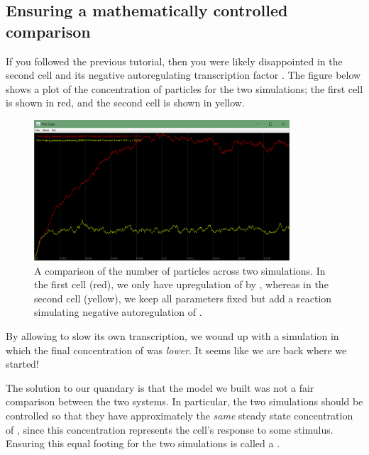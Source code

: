 \FloatBarrier
{}
\subsection{Ensuring a mathematically controlled comparison}

If you followed the previous tutorial, then you were likely disappointed in the second cell and its negative autoregulating transcription factor . The figure below shows a plot of the concentration of  particles for the two simulations; the first cell is shown in red, and the second cell is shown in yellow.

\begin{figure}[h]
\centering
\mySfFamily
\includegraphics[width = 0.85\textwidth]{../images/nar_unequal_chart.png}
\caption{A comparison of the number of  particles across two simulations. In the first cell (red), we only have upregulation of  by , whereas in the second cell (yellow), we keep all parameters fixed but add a reaction simulating negative autoregulation of .}
\label{fig:nar_unequal_chart}
\end{figure}

By allowing  to slow its own transcription, we wound up with a simulation in which the final concentration of  was \textit{lower}. It seems like we are back where we started!

The solution to our quandary is that the model we built was not a fair comparison between the two systems. In particular, the two simulations should be controlled so that they have approximately the \textit{same} steady state concentration of , since this concentration represents the cell's response to some stimulus. Ensuring this equal footing for the two simulations is called a .\\

